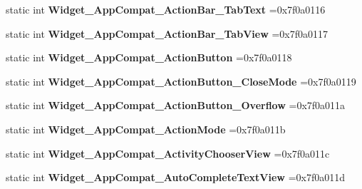 \begin{DoxyCompactItemize}
static int {\bfseries Widget\+\_\+\+App\+Compat\+\_\+\+Action\+Bar\+\_\+\+Tab\+Text} =0x7f0a0116
\item 
\mbox{\label{classandroid_1_1support_1_1v7_1_1cardview_1_1R_1_1style_ab804e681436c4464016fcdfe9a57b8b3}} 
static int {\bfseries Widget\+\_\+\+App\+Compat\+\_\+\+Action\+Bar\+\_\+\+Tab\+View} =0x7f0a0117
\item 
\mbox{\label{classandroid_1_1support_1_1v7_1_1cardview_1_1R_1_1style_a6036df41974f80b0188879f6f0e388ab}} 
static int {\bfseries Widget\+\_\+\+App\+Compat\+\_\+\+Action\+Button} =0x7f0a0118
\item 
\mbox{\label{classandroid_1_1support_1_1v7_1_1cardview_1_1R_1_1style_a6cf7918af16cc1bac86d7cd916021d02}} 
static int {\bfseries Widget\+\_\+\+App\+Compat\+\_\+\+Action\+Button\+\_\+\+Close\+Mode} =0x7f0a0119
\item 
\mbox{\label{classandroid_1_1support_1_1v7_1_1cardview_1_1R_1_1style_aa56d2b42ddc419389ff0cf2b85a92738}} 
static int {\bfseries Widget\+\_\+\+App\+Compat\+\_\+\+Action\+Button\+\_\+\+Overflow} =0x7f0a011a
\item 
\mbox{\label{classandroid_1_1support_1_1v7_1_1cardview_1_1R_1_1style_aea324efd8230b833367fcac8a4fcc69f}} 
static int {\bfseries Widget\+\_\+\+App\+Compat\+\_\+\+Action\+Mode} =0x7f0a011b
\item 
\mbox{\label{classandroid_1_1support_1_1v7_1_1cardview_1_1R_1_1style_a686960d76e773a6b2ffa92d9f47782f6}} 
static int {\bfseries Widget\+\_\+\+App\+Compat\+\_\+\+Activity\+Chooser\+View} =0x7f0a011c
\item 
\mbox{\label{classandroid_1_1support_1_1v7_1_1cardview_1_1R_1_1style_a5f570397363160608bf5cb1713c9c5b3}} 
static int {\bfseries Widget\+\_\+\+App\+Compat\+\_\+\+Auto\+Complete\+Text\+View} =0x7f0a011d
\item 
\mbox{\label{classandroid_1_1support_1_1v7_1_1cardview_1_1R_1_1style_a8fa9d6ac046bdea6818f05783f43ee93}} 

\end{DoxyCompactItemize}
